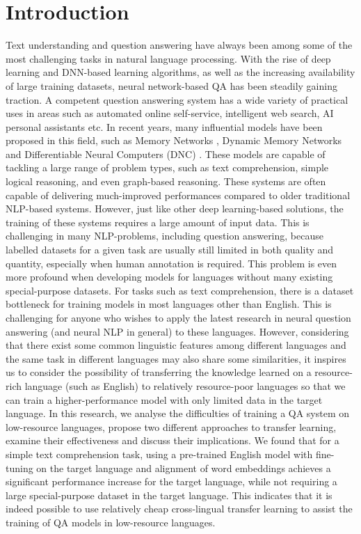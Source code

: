 \documentclass[]{article}
\begin{document}
\newpage
\tableofcontents

\newpage
\section{Introduction}
Text understanding and question answering have always been among some of the most challenging tasks in natural language processing. With the rise of deep learning and DNN-based learning algorithms, as well as the increasing availability of large training datasets, neural network-based QA has been steadily gaining traction. A competent question answering system has a wide variety of practical uses in areas such as automated online self-service, intelligent web search, AI personal assistants etc. In recent years, many influential models have been proposed in this field, such as Memory Networks \cite{sukhbaatar2015end}, Dynamic Memory Networks \cite{kumar2016ask} and Differentiable Neural Computers (DNC) \cite{graves2016hybrid}. These models are capable of tackling a large range of problem types, such as text comprehension, simple logical reasoning, and even graph-based reasoning. These systems are often capable of delivering much-improved performances compared to older traditional NLP-based systems. However, just like other deep learning-based solutions, the training of these systems requires a large amount of input data. This is challenging in many NLP-problems, including question answering, because labelled datasets for a given task are usually still limited in both quality and quantity, especially when human annotation is required. This problem is even more profound when developing models for languages without many existing special-purpose datasets. For tasks such as text comprehension, there is a dataset bottleneck for training models in most languages other than English. This is challenging for anyone who wishes to apply the latest research in neural question answering (and neural NLP in general) to these languages. However, considering that there exist some common linguistic features among different languages and the same task in different languages may also share some similarities, it inspires us to consider the possibility of transferring the knowledge learned on a resource-rich language (such as English) to relatively resource-poor languages so that we can train a higher-performance model with only limited data in the target language. In this research, we analyse the difficulties of training a QA system on low-resource languages, propose two different approaches to transfer learning, examine their effectiveness and discuss their implications. We found that for a simple text comprehension task, using a pre-trained English model with fine-tuning on the target language and alignment of word embeddings achieves a significant performance increase for the target language, while not requiring a large special-purpose dataset in the target language. This indicates that it is indeed possible to use relatively cheap cross-lingual transfer learning to assist the training of QA models in low-resource languages.
\end{document}
